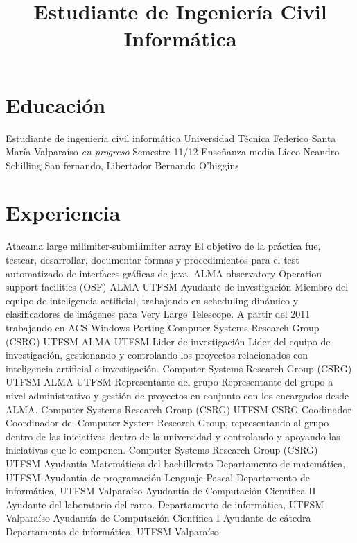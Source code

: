 \documentclass[11pt,a4paper]{moderncv}
\title{Estudiante de Ingeniería Civil Informática}
\begin{document}
\maketitle

\section{Educación}
	{Estudiante de ingeniería civil informática}
	{Universidad Técnica Federico Santa María}
	{Valparaíso}
	{\emph{en progreso}}
	{Semestre 11/12}
	{Enseñanza media}
	{Liceo Neandro Schilling}
	{San fernando, Libertador Bernando O'higgins}
	{}{}
\vspace{-0.5cm}

\section{Experiencia}
	{Atacama large milimiter-submilimiter array}
	{El objetivo de la práctica fue, testear, desarrollar, documentar formas y procedimientos para el test automatizado de 
	interfaces gráficas de java.}
	{ALMA observatory}
	{Operation support facilities (OSF)}
	{}
	{ALMA-UTFSM Ayudante de investigación}
	{Miembro del equipo de inteligencia artificial, trabajando en scheduling dinámico y clasificadores de imágenes para Very Large Telescope. 
		A partir del 2011 trabajando en ACS Windows Porting}
	{Computer Systems Research Group (CSRG)}
	{UTFSM}
	{}
	{ALMA-UTFSM Lider de investigación}
	{Lider del equipo de investigación, gestionando y controlando los proyectos relacionados con inteligencia artificial e investigación.}
	{Computer Systems Research Group (CSRG)}
	{UTFSM}
	{}
	{ALMA-UTFSM Representante del grupo}
	{Representante del grupo a nivel administrativo y gestión de proyectos en conjunto con los encargados desde ALMA.}
	{Computer Systems Research Group (CSRG)}
	{UTFSM}
	{}
	{CSRG Coodinador}
	{Coordinador del Computer System Research Group, representando al grupo dentro de las iniciativas dentro de la universidad
		y controlando y apoyando las iniciativas que lo componen.}
	{Computer Systems Research Group (CSRG)}
	{UTFSM}
	{}
	{Ayudantía}
	{Matemáticas del bachillerato}
	{Departamento de matemática, UTFSM}
	{}{}
	{Ayudantía de programación}
	{Lenguaje Pascal}
	{Departamento de informática, UTFSM}
	{Valparaíso}
	{}
	{Ayudantía de Computación Científica II}
	{Ayudante del laboratorio del ramo.}
	{Departamento de informática, UTFSM}
	{Valparaíso}
	{}
	{Ayudantía de Computación Científica I}
	{Ayudante de cátedra}
	{Departamento de informática, UTFSM}
	{Valparaíso}
	{}
\end{document}
